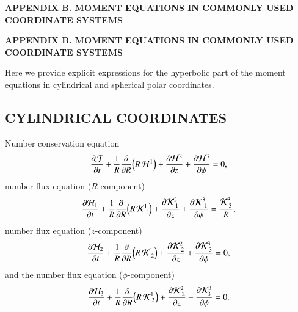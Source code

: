 \documentclass[11pt,letterpaper,twoside,english,final]{article}
\begin{document}
\newpage

\renewcommand{\thepage}{B-\arabic{page}} 
\setcounter{page}{1}
\thispagestyle{empty}

\vspace*{4in}
{}
\begin{center}
{\bf\Large{APPENDIX B. MOMENT EQUATIONS IN COMMONLY USED COORDINATE SYSTEMS}}
\end{center}

\clearemptydoublepage

\newpage

\renewcommand{\thepage}{B-\arabic{page}} 
\setcounter{page}{3}

\begin{center}
{\bf\large {APPENDIX B.  MOMENT EQUATIONS IN COMMONLY USED COORDINATE SYSTEMS}}
\end{center}
\label{app:CurvilinearEuler}

Here we provide explicit expressions for the hyperbolic part of the moment equations in cylindrical and spherical polar coordinates.  

\subsection{CYLINDRICAL COORDINATES}

Number conservation equation
\begin{equation}
  \frac{\partial \mathcal{J}}{\partial t}
  +\frac{1}{R}\frac{\partial }{\partial R}\Big(R\,\mathcal{H}^{1}\Big)
  +\frac{\partial \mathcal{H}^{2}}{\partial z}
  +\frac{\partial \mathcal{H}^{3}}{\partial \phi}=0,
\end{equation}
number flux equation ($R$-component)
\begin{equation}
  \frac{\partial \mathcal{H}_{1}}{\partial t}
  +\frac{1}{R}\frac{\partial }{\partial R}\Big(R\,\mathcal{K}^{1}_{~1}\Big)
  +\frac{\partial \mathcal{K}^{2}_{~1}}{\partial z}
  +\frac{\partial \boldsymbol{\mathcal{K}}^{3}_{~1}}{\partial \phi}
  =\frac{\mathcal{K}^{3}_{~3}}{R},
\end{equation}
number flux equation ($z$-component)
\begin{equation}
  \frac{\partial \mathcal{H}_{2}}{\partial t}
  +\frac{1}{R}\frac{\partial }{\partial R}\Big(R\,\mathcal{K}^{1}_{~2}\Big)
  +\frac{\partial \mathcal{K}^{2}_{~2}}{\partial z}
  +\frac{\partial \mathcal{K}^{3}_{~3}}{\partial \phi}=0,
\end{equation}
and the number flux equation ($\phi$-component)
\begin{equation}
  \frac{\partial \mathcal{H}_{3}}{\partial t}
  +\frac{1}{R}\frac{\partial }{\partial R}\Big(R\,\mathcal{K}^{1}_{~3}\Big)
  +\frac{\partial \mathcal{K}^{2}_{~2}}{\partial z}
  +\frac{\partial \mathcal{K}^{3}_{3}}{\partial \phi}=0.
\end{equation}
\end{document}
